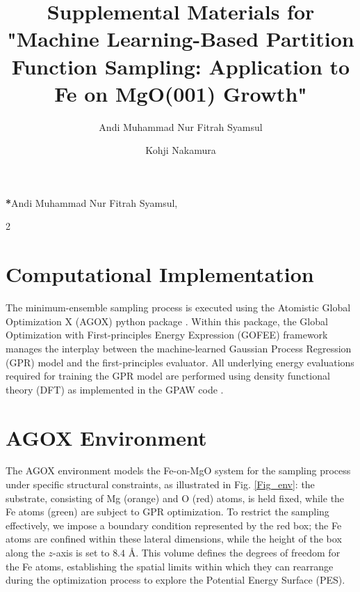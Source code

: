 \documentclass[12pt]{spieman}  %
\title{Supplemental Materials for "Machine Learning-Based Partition Function Sampling: Application to Fe on MgO(001) Growth"}
\author[a]{Andi Muhammad Nur Fitrah Syamsul}
\author[a]{Kohji Nakamura}
\affil[a]{Graduate School of Engineering, Mie University, Tsu, Mie 514-8507}
\begin{document}
 
\maketitle


{\noindent \footnotesize\textbf{*}Andi Muhammad Nur Fitrah Syamsul,   }

\begin{spacing}{2}   %

\newpage

\section{Computational Implementation}

The minimum-ensemble sampling process is executed using the Atomistic Global Optimization X (AGOX) python package \cite{Christiansen2022}. Within this package, the Global Optimization with First-principles Energy Expression (GOFEE) framework manages the interplay between the machine-learned Gaussian Process Regression (GPR) model and the first-principles evaluator. All underlying energy evaluations required for training the GPR model are performed using density functional theory (DFT) as implemented in the GPAW code \cite{jussi2010, Mortensen2024}.

\section{AGOX Environment}

The AGOX environment models the Fe-on-MgO system for the sampling process under specific structural constraints, as illustrated in Fig. \ref{Fig_env}: the substrate, consisting of Mg (orange) and O (red) atoms, is held fixed, while the Fe atoms (green) are subject to GPR optimization. To restrict the sampling effectively, we impose a boundary condition represented by the red box; the Fe atoms are confined within these lateral dimensions, while the height of the box along the $z$-axis is set to $8.4\text{ \AA}$. This volume defines the degrees of freedom for the Fe atoms, establishing the spatial limits within which they can rearrange during the optimization process to explore the Potential Energy Surface (PES).


\end{spacing}
\end{document}
